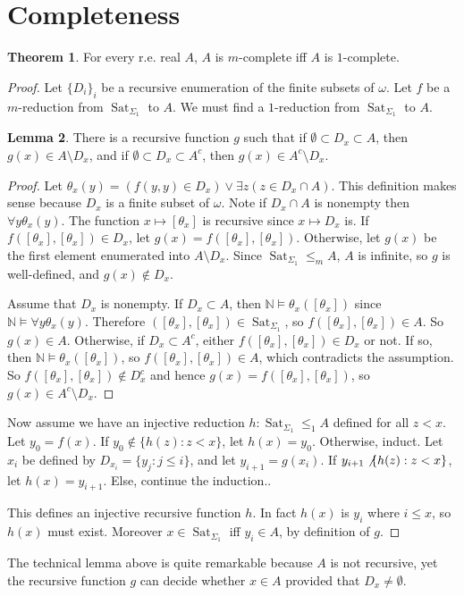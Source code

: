 \documentclass[12pt]{report}
\newcommand{\NN}{\mathbb{N}}
\DeclareMathOperator{\Sat}{Sat}
\theoremstyle{definition}
\newtheorem{theorem}{Theorem}[chapter]
\newtheorem{lemma}[theorem]{Lemma}
\begin{document}
\section{Completeness}
\begin{theorem}
For every r.e. real $A$, $A$ is $m$-complete iff $A$ is $1$-complete.
\end{theorem}
\begin{proof}
Let $\{D_i\}_i$ be a recursive enumeration of the finite subsets of $\omega$. Let $f$ be a $m$-reduction from $\Sat_{\Sigma_1}$ to $A$.
We must find a $1$-reduction from $\Sat_{\Sigma_1}$ to $A$.

\begin{lemma}
There is a recursive function $g$ such that if $\emptyset \subset D_x \subset A$, then $g(x) \in A \setminus D_x$, and if $\emptyset \subset D_x \subset A^c$, then $g(x) \in A^c \setminus D_x$.
\end{lemma}
\begin{proof}
Let $\theta_x(y) = (f(y, y) \in D_x) \vee \exists z(z \in D_x \cap A)$. This definition makes sense because $D_x$ is a finite subset of $\omega$. Note if $D_x \cap A$ is nonempty then $\forall y\theta_x(y)$.
The function $x \mapsto [\theta_x]$ is recursive since $x \mapsto D_x$ is. If $f([\theta_x], [\theta_x]) \in D_x$, let $g(x) = f([\theta_x], [\theta_x])$. Otherwise, let $g(x)$ be the first element enumerated into $A \setminus D_x$.
Since $\Sat_{\Sigma_1} \leq_m A$, $A$ is infinite, so $g$ is well-defined, and $g(x) \notin D_x$.

Assume that $D_x$ is nonempty. If $D_x \subset A$, then $\NN \models \theta_x([\theta_x])$ since $\NN \models \forall y \theta_x(y)$. Therefore $([\theta_x], [\theta_x]) \in \Sat_{\Sigma_1}$, so $f([\theta_x], [\theta_x]) \in A$. So $g(x) \in A$.
Otherwise, if $D_x \subset A^c$, either $f([\theta_x], [\theta_x]) \in D_x$ or not. If so, then $\NN \models \theta_x([\theta_x])$, so $f([\theta_x], [\theta_x]) \in A$, which contradicts the assumption.
So $f([\theta_x], [\theta_x]) \notin D_x^c$ and hence $g(x) = f([\theta_x], [\theta_x])$, so $g(x) \in A^c \setminus D_x$.
\end{proof}

Now assume we have an injective reduction $h: \Sat_{\Sigma_1} \leq_1 A$ defined for all $z < x$.
Let $y_0 = f(x)$. If $y_0 \notin \{h(z): z < x\}$, let $h(x) = y_0$. Otherwise, induct.
Let $x_i$ be defined by $D_{x_i} = \{y_j: j \leq i\}$, and let $y_{i+1} = g(x_i)$.
If $y_{i+1} \not \{h(z): z < x\}$, let $h(x) = y_{i+1}$. Else, continue the induction..

This defines an injective recursive function $h$. In fact $h(x)$ is $y_i$ where $i \leq x$, so $h(x)$ must exist. Moreover $x \in \Sat_{\Sigma_1}$ iff $y_i \in A$, by definition of $g$.
\end{proof}
The technical lemma above is quite remarkable because $A$ is not recursive, yet the recursive function $g$ can decide whether $x \in A$ provided that $D_x \neq \emptyset$.
\end{document}
